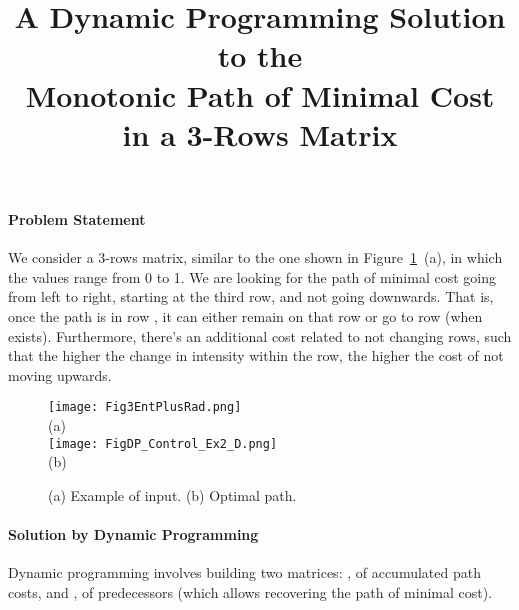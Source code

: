 \documentclass[a4paper,twoside]{article}
\begin{document}
\title{A Dynamic Programming Solution to the\\Monotonic Path of Minimal Cost in a 3-Rows Matrix}

\author{
}



\onecolumn \maketitle \normalsize \vfill


\paragraph{Problem Statement}

We consider a 3-rows matrix, similar to the one shown in Figure~\ref{fig:dp}~(a),
in which the values range from 0 to 1.
We are looking for the path of minimal
cost going from left to right, starting at the third row, and not going downwards.
That is, once the path is in row , it can either remain
on that row or go to row  (when  exists).
Furthermore, there's an additional cost related to not changing rows,
such that the higher the change in intensity
within the row, the higher the cost of not moving upwards.

\begin{figure}[t!]
\begin{center}
	\texttt{[image: Fig3EntPlusRad.png]}\\
	(a)\\
	\vspace{0.3cm}
	\texttt{[image: FigDP\_Control\_Ex2\_D.png]}\\
	(b)
\end{center}
\caption{(a) Example of input. (b) Optimal path.}
\label{fig:dp}
\end{figure}

\paragraph{Solution by Dynamic Programming}
Dynamic programming involves building two matrices:
, of accumulated path costs, and , of predecessors (which allows recovering
the path of minimal cost).
\end{document}
